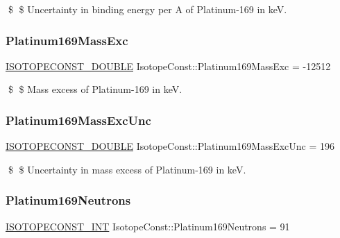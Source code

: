 \$ \$ Uncertainty in binding energy per A of Platinum-\/169 in keV. \mbox{\label{group___isotope_const-_platinum-_pt169_ga830d3ced761a766a733f58d576255e17}} 
\subsubsection{\texorpdfstring{Platinum169\+Mass\+Exc}{Platinum169MassExc}}
{\footnotesize\ttfamily \mbox{\hyperlink{group___isotope_const-_macros_ga8f45a7272ce02c0b4c65c44636ed719a}{I\+S\+O\+T\+O\+P\+E\+C\+O\+N\+S\+T\+\_\+\+D\+O\+U\+B\+LE}} Isotope\+Const\+::\+Platinum169\+Mass\+Exc = -\/12512}

\$ \$ Mass excess of Platinum-\/169 in keV. \mbox{\label{group___isotope_const-_platinum-_pt169_gafb68d9b17db6ed7bd12b4ea9d697e654}} 
\subsubsection{\texorpdfstring{Platinum169\+Mass\+Exc\+Unc}{Platinum169MassExcUnc}}
{\footnotesize\ttfamily \mbox{\hyperlink{group___isotope_const-_macros_ga8f45a7272ce02c0b4c65c44636ed719a}{I\+S\+O\+T\+O\+P\+E\+C\+O\+N\+S\+T\+\_\+\+D\+O\+U\+B\+LE}} Isotope\+Const\+::\+Platinum169\+Mass\+Exc\+Unc = 196}

\$ \$ Uncertainty in mass excess of Platinum-\/169 in keV. \mbox{\label{group___isotope_const-_platinum-_pt169_ga46794861398ebc8f1b7837855e9a9274}} 
\subsubsection{\texorpdfstring{Platinum169\+Neutrons}{Platinum169Neutrons}}
{\footnotesize\ttfamily \mbox{\hyperlink{group___isotope_const-_macros_ga5f18360b3e99483a35c32d789e62621c}{I\+S\+O\+T\+O\+P\+E\+C\+O\+N\+S\+T\+\_\+\+I\+NT}} Isotope\+Const\+::\+Platinum169\+Neutrons = 91}

